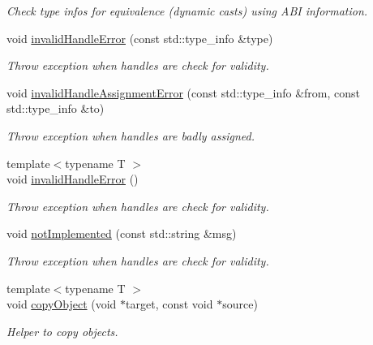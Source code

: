 \begin{DoxyCompactItemize}
\begin{DoxyCompactList}\small\item\em Check type infos for equivalence (dynamic casts) using ABI information. \item\end{DoxyCompactList}\item 
void \hyperlink{namespace_d_d4hep_abe634ec00c4fc9e3a5e722ad0865d848}{invalidHandleError} (const std::type\_\-info \&type)
\begin{DoxyCompactList}\small\item\em Throw exception when handles are check for validity. \item\end{DoxyCompactList}\item 
void \hyperlink{namespace_d_d4hep_a5f946a2ebf8795b6a70037ff00ad2aab}{invalidHandleAssignmentError} (const std::type\_\-info \&from, const std::type\_\-info \&to)
\begin{DoxyCompactList}\small\item\em Throw exception when handles are badly assigned. \item\end{DoxyCompactList}\item 
{\footnotesize template$<$typename T $>$ }\\void \hyperlink{namespace_d_d4hep_aba3125de6fc50debd292ce20b9ea62c4}{invalidHandleError} ()
\begin{DoxyCompactList}\small\item\em Throw exception when handles are check for validity. \item\end{DoxyCompactList}\item 
void \hyperlink{namespace_d_d4hep_a2567960a4486c9f442089e0893b84d27}{notImplemented} (const std::string \&msg)
\begin{DoxyCompactList}\small\item\em Throw exception when handles are check for validity. \item\end{DoxyCompactList}\item 
{\footnotesize template$<$typename T $>$ }\\void \hyperlink{namespace_d_d4hep_a765166684fc83ac1fdd00ad6e92e82b9}{copyObject} (void $\ast$target, const void $\ast$source)
\begin{DoxyCompactList}\small\item\em Helper to copy objects. \item\end{DoxyCompactList}\item 

\end{DoxyCompactItemize}
